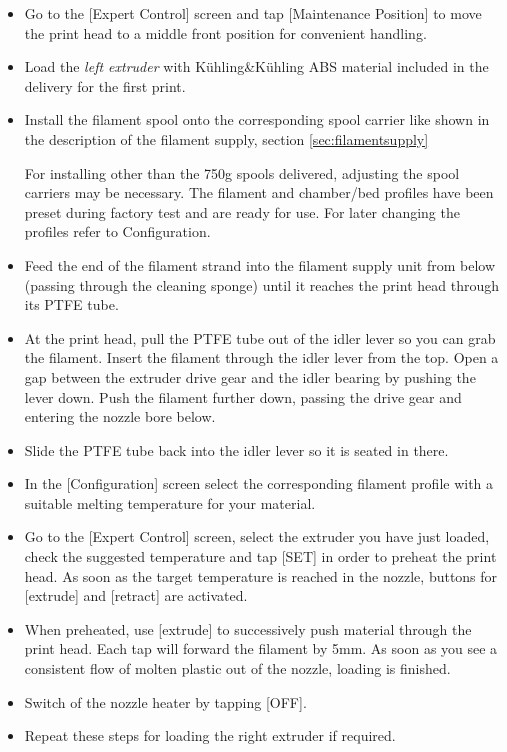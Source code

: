 \begin{itemize}
  \item Go to the [Expert Control] screen and tap [Maintenance Position] to move the print head to a middle front 
        position for convenient handling.
  \item Load the \emph{left extruder} with Kühling\&Kühling ABS material included 
        in the delivery for the first print.        
  \item Install the filament spool onto the corresponding spool carrier like shown in the description of the filament supply, section \ref{sec:filamentsupply}
  \begin{info}
    For installing other than the 750g spools delivered, adjusting the spool carriers may be necessary.
    The filament and chamber/bed profiles have been preset during factory test and are ready for use. For later changing the profiles refer to Configuration.
  \end{info}        
  \item Feed the end of the filament strand into the filament supply unit from below (passing through the cleaning sponge) 
        until it reaches the print head through its PTFE tube.
  \item At the print head, pull the PTFE tube out of the idler lever so you can grab the filament. Insert the filament through
        the idler lever from the top. Open a gap between the extruder drive gear and the idler bearing by pushing the lever down.
        Push the filament further down, passing the drive gear and entering the nozzle bore below.
  \item Slide the PTFE tube back into the idler lever so it is seated in there.
  \item In the [Configuration] screen select the corresponding filament profile with a suitable melting temperature for your material.
  \item Go to the [Expert Control] screen, select the extruder you have just loaded, check the suggested temperature
        and tap [SET] in order to preheat the print head. As soon as the target temperature is reached in the nozzle, buttons for
        [extrude] and [retract] are activated.
  \item When preheated, use [extrude] to successively push material through the print head. Each tap will forward the filament
        by 5mm. As soon as you see a consistent flow of molten plastic out of the nozzle, loading is finished.
  \item Switch of the nozzle heater by tapping [OFF].
  \item Repeat these steps for loading the right extruder if required.
\end{itemize}


